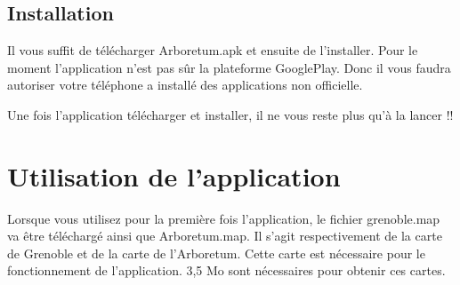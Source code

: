 \documentclass[a4paper,11pt]{article}
\begin{document}
   \subsection{Installation}
   Il vous suffit de télécharger Arboretum.apk et ensuite de l'installer. Pour le moment l'application n'est pas sûr la plateforme GooglePlay. Donc il 
   vous faudra autoriser votre téléphone a installé des applications non officielle.
   
   Une fois l'application télécharger et installer, il ne vous reste plus qu'à la lancer !!
   
   \section{Utilisation de l'application}
       Lorsque vous utilisez pour la première fois l'application, le fichier grenoble.map va être téléchargé ainsi que Arboretum.map. Il s'agit respectivement de la
       carte de Grenoble et de la carte de l'Arboretum.
    Cette carte est nécessaire pour le fonctionnement de l'application. 3,5 Mo sont nécessaires pour obtenir ces cartes.
\end{document}
